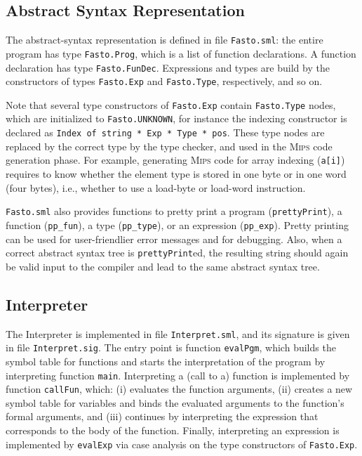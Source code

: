 \documentclass[a4paper,11pt]{article}
\newcommand{\mips}{\textsc{Mips}\xspace}
\begin{document}
\subsection*{Abstract Syntax Representation}
\label{subsec:AbSyn}

The abstract-syntax representation is defined in file 
{\tt Fasto.sml}: the entire program has type {\tt Fasto.Prog}, which is a
list of function declarations. A function declaration has type {\tt Fasto.FunDec}. 
Expressions and types are build by the constructors of types 
{\tt Fasto.Exp} and {\tt Fasto.Type}, respectively, and so on. 

Note that several type constructors of {\tt Fasto.Exp} contain
{\tt Fasto.Type} nodes, which are initialized to 
{\tt Fasto.UNKNOWN}, for instance the indexing constructor is declared as {\tt Index of string * Exp * Type * pos}.  
These type nodes are replaced by the correct type by the type checker, 
and used in the \mips code generation phase. For example,
generating \mips code for array indexing ({\tt a[i]}) 
requires to know whether the element type is stored in one byte or
in one word (four bytes), i.e., whether to use a load-byte or load-word instruction.

{\tt Fasto.sml} also provides functions 
to pretty print a program ({\tt prettyPrint}),
a function ({\tt pp\_fun}), a type ({\tt pp\_type}), or
an expression ({\tt pp\_exp}).   Pretty printing can be used 
for user-friendlier error messages and for debugging. 
%
Also, when a correct abstract syntax tree is \texttt{prettyPrint}ed, 
the resulting string should again be valid input to the compiler and lead 
to the same abstract syntax tree.

\subsection*{Interpreter}

The Interpreter is implemented in file {\tt Interpret.sml},
and its signature is given in file {\tt Interpret.sig}. 
The entry point is function {\tt evalPgm}, which builds the
symbol table for functions and starts the interpretation of the 
program by interpreting function {\tt main}.
%
Interpreting a (call to a) function is implemented by function
{\tt callFun}, which: (i) evaluates the function arguments, 
(ii) creates a new symbol table for variables and binds the evaluated
arguments to the function's formal arguments, and (iii) continues
by interpreting the expression that corresponds to the body of the function.
%
Finally, interpreting an expression is implemented by {\tt evalExp}
via case analysis on the type constructors of {\tt Fasto.Exp}.
\end{document}
